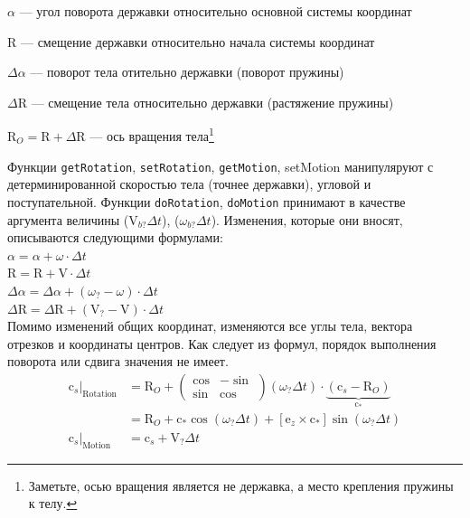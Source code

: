 \documentclass[a4paper,14pt]{extreport}
\newcommand{\br}[1]{\boldsymbol{\mathrm{#1}}}
\renewcommand{\vec}[1]{\br{#1}}
\newenvironment{packed_itemize}{
\begin{itemize}
  \setlength{\itemsep}{1pt}
  \setlength{\parskip}{0pt}
  \setlength{\parsep}{0pt}
}{\end{itemize}}
\begin{document}
\begin{packed_itemize}
\item $\alpha$ --- угол поворота державки относительно основной системы координат
\item $\vec R$ --- смещение державки относительно начала системы координат
\item $\Delta \alpha$ --- поворот тела отительно державки (поворот пружины)
\item $\Delta \vec R$ --- смещение тела относительно державки (растяжение пружины)
\item $\vec R_O = \vec R + \Delta \vec R$ --- ось вращения тела\footnote{Заметьте, осью вращения является не державка, а место крепления пружины к телу.}
\end{packed_itemize}

Функции \texttt{getRotation}, \texttt{setRotation}, \texttt{getMotion}, setMotion манипуляруют с детерминированной скоростью тела (точнее державки), угловой и поступательной.
Функции \texttt{doRotation}, \texttt{doMotion} принимают в качестве аргумента величины ($\vec V_{b?} \Delta t$), ($\omega_{b?} \Delta t$). Изменения, которые они вносят, описываются следующими формулами:\\
$\alpha = \alpha + \omega \cdot \Delta t$\\
$\vec R = \vec R + \vec V \cdot \Delta t$\\
$\Delta \alpha = \Delta \alpha + (\omega_{?} - \omega) \cdot \Delta t$\\
$\Delta \vec R = \Delta \vec R + (\vec V_{?} - \vec V) \cdot \Delta t$\\

Помимо изменений общих координат, изменяются все углы тела, вектора отрезков и координаты центров. Как следует из формул, порядок выполнения поворота или сдвига значения не имеет.
\begin{equation*}
\begin{split}
\vec c_s \vert_\text{Rotation}
& = \vec R_O +
\begin{pmatrix}
\cos & -\sin \\ \sin & \cos
\end{pmatrix}
(\omega_? \Delta t) \cdot \underbrace{(\vec c_s - \vec R_O)}_{\vec c_*}\\
& = \vec R_O + \vec c_* \cos(\omega_? \Delta t) + [\vec e_z \times \vec c_*] \sin(\omega_? \Delta t)
\\ \vec c_s \vert_\text{Motion} &= \vec c_s + \vec V_? \Delta t
\end{split}
\end{equation*}
\end{document}
